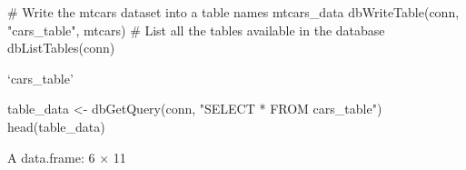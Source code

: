 \documentclass[
  letterpaper,
  DIV=11,
  numbers=noendperiod]{scrreprt}
\newenvironment{Shaded}{\begin{snugshade}}{\end{snugshade}}
\newcommand{\CommentTok}[1]{\textcolor[rgb]{0.37,0.37,0.37}{#1}}
\newcommand{\FunctionTok}[1]{\textcolor[rgb]{0.28,0.35,0.67}{#1}}
\newcommand{\NormalTok}[1]{\textcolor[rgb]{0.00,0.23,0.31}{#1}}
\newcommand{\OtherTok}[1]{\textcolor[rgb]{0.00,0.23,0.31}{#1}}
\newcommand{\StringTok}[1]{\textcolor[rgb]{0.13,0.47,0.30}{#1}}
\begin{document}
\begin{Shaded}
\begin{Highlighting}[]
\CommentTok{\# Write the mtcars dataset into a table names mtcars\_data}
\FunctionTok{dbWriteTable}\NormalTok{(conn, }\StringTok{"cars\_table"}\NormalTok{, mtcars)}
\CommentTok{\# List all the tables available in the database}
\FunctionTok{dbListTables}\NormalTok{(conn)}
\end{Highlighting}
\end{Shaded}

`cars\_table'

\begin{Shaded}
\begin{Highlighting}[]
\NormalTok{table\_data }\OtherTok{\textless{}{-}} \FunctionTok{dbGetQuery}\NormalTok{(conn, }\StringTok{"SELECT * FROM cars\_table"}\NormalTok{)}
\FunctionTok{head}\NormalTok{(table\_data)}
\end{Highlighting}
\end{Shaded}

A data.frame: 6 × 11
\end{document}
